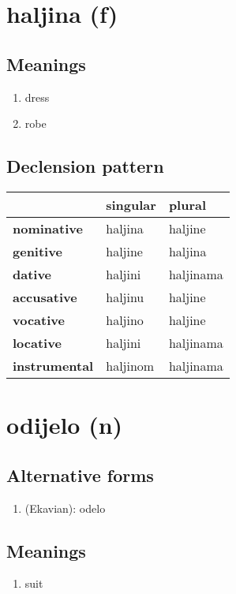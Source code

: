 \filbreak
\section{haljina (f)}
\subsection*{Meanings}
\begin{enumerate}
\item dress
\item robe
\end{enumerate}
\subsection*{Declension pattern}
\begin{tabularx}{\linewidth}{Xll}
\toprule
{} &  singular &     plural \\
\midrule
\textbf{nominative  } &   haljina &    haljine \\
\textbf{genitive    } &   haljine &    haljina \\
\textbf{dative      } &   haljini &  haljinama \\
\textbf{accusative  } &   haljinu &    haljine \\
\textbf{vocative    } &   haljino &    haljine \\
\textbf{locative    } &   haljini &  haljinama \\
\textbf{instrumental} &  haljinom &  haljinama \\
\bottomrule
\end{tabularx}

\filbreak
\section{odijelo (n)}
\subsection*{Alternative forms}
\begin{enumerate}
\item (Ekavian): odelo
\end{enumerate}
\subsection*{Meanings}
\begin{enumerate}
\item suit
\end{enumerate}
